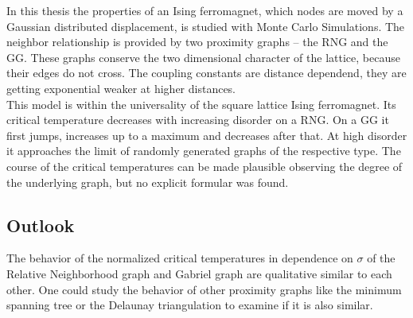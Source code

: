 In this thesis the properties of an Ising ferromagnet, which nodes are
moved by a Gaussian distributed displacement, is studied with Monte Carlo
Simulations. The neighbor relationship is provided by two proximity graphs
-- the RNG and the GG. These graphs conserve the two dimensional character
of the lattice, because their edges do not cross. The coupling constants
are distance dependend, they are getting exponential weaker at higher distances.\\
This model is within the universality of the square lattice Ising
ferromagnet. Its critical temperature decreases with increasing disorder
on a RNG. On a GG it first jumps, increases up to a maximum and decreases
after that. At high disorder it approaches the limit of randomly generated
graphs of the respective type. The course of the critical temperatures
can be made plausible observing the degree of the underlying graph, but
no explicit formular was found.

\subsection{Outlook}
    The behavior of the normalized critical temperatures in dependence
    on \(\sigma\) of the Relative Neighborhood graph and Gabriel graph
    are qualitative similar to each other. One could study the behavior
    of other proximity graphs like the minimum spanning tree or the
    Delaunay triangulation to examine if it is also similar.\\
